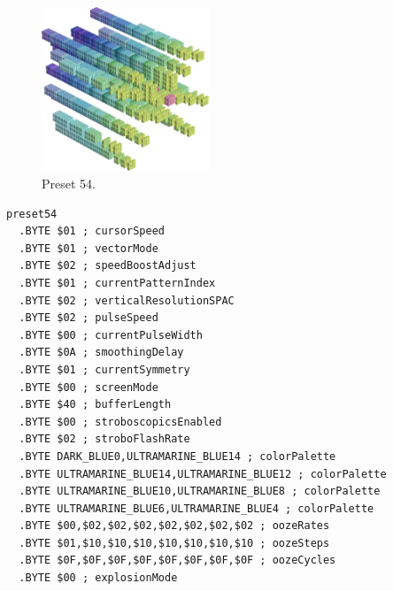 \clearpage
\begin{minipage}[b]{0.48\linewidth}
\begin{figure}[H]                                                          
  \centering                                                             
  \begin{adjustbox}{width=5cm,center}                                   
  \includegraphics[width=5cm]{src/colorspace_presets/preset54-45.png}%
  \end{adjustbox}                                                        
\caption*{Preset 54.}                                           
\end{figure}                                                               
\end{minipage}
\hspace{0.1cm}
\begin{minipage}[b]{0.48\linewidth}                            
\begin{lstlisting}[basicstyle=\ttfamily\tiny]
preset54
  .BYTE $01 ; cursorSpeed
  .BYTE $01 ; vectorMode
  .BYTE $02 ; speedBoostAdjust
  .BYTE $01 ; currentPatternIndex
  .BYTE $02 ; verticalResolutionSPAC
  .BYTE $02 ; pulseSpeed
  .BYTE $00 ; currentPulseWidth
  .BYTE $0A ; smoothingDelay
  .BYTE $01 ; currentSymmetry
  .BYTE $00 ; screenMode
  .BYTE $40 ; bufferLength
  .BYTE $00 ; stroboscopicsEnabled
  .BYTE $02 ; stroboFlashRate
  .BYTE DARK_BLUE0,ULTRAMARINE_BLUE14 ; colorPalette
  .BYTE ULTRAMARINE_BLUE14,ULTRAMARINE_BLUE12 ; colorPalette
  .BYTE ULTRAMARINE_BLUE10,ULTRAMARINE_BLUE8 ; colorPalette
  .BYTE ULTRAMARINE_BLUE6,ULTRAMARINE_BLUE4 ; colorPalette
  .BYTE $00,$02,$02,$02,$02,$02,$02,$02 ; oozeRates
  .BYTE $01,$10,$10,$10,$10,$10,$10,$10 ; oozeSteps
  .BYTE $0F,$0F,$0F,$0F,$0F,$0F,$0F,$0F ; oozeCycles
  .BYTE $00 ; explosionMode
\end{lstlisting}
\end{minipage}

\vspace*{-0.5cm}

